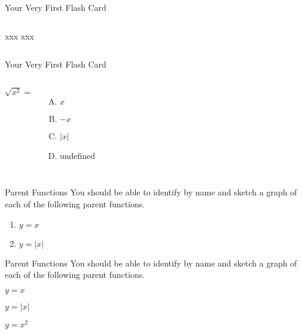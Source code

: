 \documentclass{beamer}
\begin{document}
\begin{frame}[t]{Your Very First Flash Card} \vspace{10pt}
\begin{columns}[onlytextwidth]
xxx
xxx
\end{columns}
\end{frame}


\begin{frame}[t]{Your Very First Flash Card} \vspace{10pt}
\begin{columns}[onlytextwidth]
$\sqrt{x^2}=$\\[10pt]
\begin{enumerate}[(A)]
\item $x$
\item $-x$
\item $|x|$
\item undefined
\end{enumerate}
\end{columns}
\end{frame}

\begin{frame}[t]{Parent Functions} \vspace{4pt} \small
You should be able to identify by name and sketch a graph of each of the following parent functions.
\begin{enumerate}
\item $y=x$
\item $y=|x|$
\end{enumerate}

\end{frame}

\begin{frame}[t]{Parent Functions} \vspace{4pt} \scriptsize
You should be able to identify by name and sketch a graph of each of the following parent functions.
\begin{enumerate}
\begin{multicols}{3}
\item $y=x$
\item $y=|x|$
\item $y=x^2$
\end{multicols}
\end{enumerate}

\end{frame}
\end{document}
